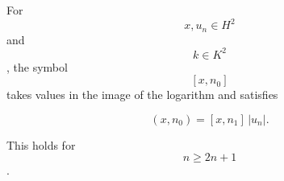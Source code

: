 For $$x, u_n \in H^2$$ and $$k \in K^2$$, the symbol $$[x, n_0]$$ takes values in the image of the logarithm and satisfies

$$(x, n_0) = [x, n_1] \, |u_n|.$$

This holds for $$n \geq 2n + 1$$.
